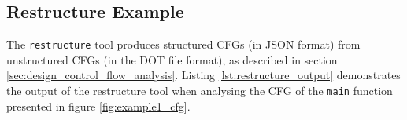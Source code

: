 
\subsection{Restructure Example}
\label{app:restructure_example}

The \texttt{restructure} tool produces structured CFGs (in JSON format) from unstructured CFGs (in the DOT file format), as described in section \ref{sec:design_control_flow_analysis}. Listing \ref{lst:restructure_output} demonstrates the output of the restructure tool when analysing the CFG of the \texttt{main} function presented in figure \ref{fig:example1_cfg}.


